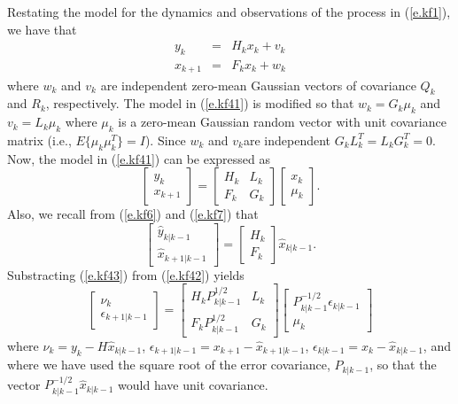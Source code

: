 	Restating the model for the dynamics and
observations of the process in (\ref{e.kf1}), we have that
%
\begin{eqnarray}
y_k&=&H_kx_k+v_k\nonumber\\
x_{k+1}&=&F_kx_k+w_k
\label{e.kf41}
\end{eqnarray}
%
where $w_k$ and $v_k$ are independent zero-mean Gaussian
vectors of covariance $Q_k$ and $R_k$, respectively.
The model in (\ref{e.kf41}) is modified so that
$w_k=G_k\mu_k$ and $v_k=L_k\mu_k$ where $\mu_k$ is
a zero-mean Gaussian random vector with 
unit covariance matrix (i.e., $E\{\mu_k\mu_k^T\}=I$).  Since $w_k$ and
$v_k$are independent $G_kL_k^T=L_kG_k^T=0.$
Now, the model in (\ref{e.kf41}) can be expressed as
%
\begin{equation}
\left[\begin{array}{c}y_k\\x_{k+1}\end{array}\right]
=
  \left[\begin{array}{cc}H_k&L_k\\
                         F_k&G_k\end{array}\right]
           \left[\begin{array}{c}x_k\\\mu_k\end{array}\right].
\label{e.kf42}
\end{equation}
%
Also, we recall from (\ref{e.kf6}) and (\ref{e.kf7}) that
%
\begin{equation}
\left[\begin{array}{c}\hat{y}_{k|k-1}\\\hat{x}_{k+1|k-1}\end{array}\right]
=
           \left[\begin{array}{c}H_k\\F_k\end{array}\right]\hat{x}_{k|k-1}.
\label{e.kf43}
\end{equation}
%
Substracting (\ref{e.kf43}) from (\ref{e.kf42}) yields
%
\begin{equation}
\left[\begin{array}{c}\nu_k\\\epsilon_{k+1|k-1}\end{array}\right]
=
  \left[\begin{array}{cc}H_kP_{k|k-1}^{1/2}&L_k\\
                         F_kP_{k|k-1}^{1/2}&G_k\end{array}\right]
\left[\begin{array}{c}P_{k|k-1}^{-1/2}\epsilon_{k|k-1}\\\mu_k\end{array}\right]
\label{e.kf44}
\end{equation}
%
where $\nu_k=y_k-H\hat{x}_{k|k-1}$, $\epsilon_{k+1|k-1}=x_{k+1}-\hat{x}_
{k+1|k-1}$, $\epsilon_{k|k-1}=x_k-\hat{x}_{k|k-1}$, and
where we have used the square root of the error 
covariance, $P_{k|k-1}$, so that the vector $P_{k|k-1}^{-1/2}\hat{x}_{k|k-1}$
would have unit covariance.

